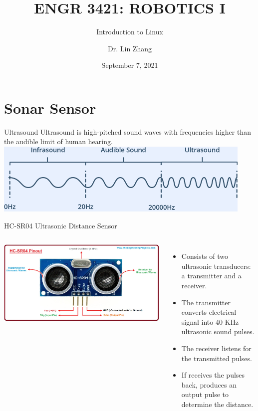 \documentclass[12pt,letterpaper]{beamer}
\title[Robotics I]
{ENGR 3421: ROBOTICS I}
\subtitle{Introduction to Linux}
\author[Zhang, Lin]
{Dr. Lin Zhang}
\institute[UCA] %
{
  Department of Physics and Astronomy\\
  University of Central Arkansas
}
\date[Robotics1 2021] %
{September 7, 2021}
\begin{document}
\frame{\titlepage}


\section{Sonar Sensor}

\begin{frame}{Ultrasound}
    Ultrasound is high-pitched sound waves with frequencies higher than the audible limit of human hearing.
    {\centering
        \includegraphics[width=0.8\linewidth]{ultrasound_frequency}
    }
\end{frame}

\begin{frame}{HC-SR04 Ultrasonic Distance Sensor}
    \begin{columns}
        \includegraphics[width=1.1\linewidth]{HC-SR04}

        {\scriptsize
            \begin{itemize} 
                \item Consists of two ultrasonic transducers: a transmitter and a receiver. 
                \item The transmitter converts electrical signal into 40 KHz ultrasonic sound pulses. 
                \item The receiver listens for the transmitted pulses. 
                \item If receives the pulses back, produces an output pulse to determine the distance. 
            \end{itemize} 
        }
    \end{columns}
\end{frame}
\end{document}
